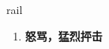 
\begin{frame}
{\huge rail}
\begin{center}
\begin{enumerate}\Large
  \item \textbf{怒骂，猛烈抨击}
\end{enumerate}
\end{center}
\end{frame}
